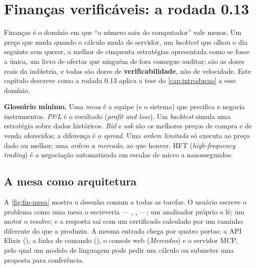 \chapter{Finanças verificáveis: a rodada 0.13}\label{cap:financas}

Finanças é o domínio em que ``o número saiu do computador'' vale menos. Um preço que muda quando o cálculo muda de servidor, um \textit{backtest} que olhou o dia seguinte sem querer, a melhor de cinquenta estratégias apresentada como se fosse a única, um livro de ofertas que ninguém de fora consegue auditar: são as dores reais da indústria, e todas são dores de \textbf{verificabilidade}, não de velocidade. Este capítulo descreve como a rodada 0.13 aplica a tese do \autoref{cap:introducao} a esse domínio.

\begin{graduacao}
\textbf{Glossário mínimo.} Uma \emph{mesa} é a equipe (e o sistema) que precifica e negocia instrumentos. \emph{P\&L} é o resultado (\textit{profit and loss}). Um \emph{backtest} simula uma estratégia sobre dados históricos. \emph{Bid} e \emph{ask} são os melhores preços de compra e de venda oferecidos; a diferença é o \emph{spread}. Uma \emph{ordem limitada} só executa ao preço dado ou melhor; uma \emph{ordem a mercado}, ao que houver. HFT (\textit{high-frequency trading}) é a negociação automatizada em escalas de micro a nanossegundos.
\end{graduacao}

\section{A mesa como arquitetura}\label{sec:fin-mesa}

A \autoref{fig:fin-mesa} mostra o desenho comum a todas as tarefas. O usuário escreve o problema como uma mesa o escreveria --- , ,  ---; um analisador próprio o lê; um motor o resolve; e a resposta sai com um certificado calculado por um caminho diferente do que a produziu. A mesma entrada chega por quatro portas: a API Elixir (), a linha de comando (), o console web (\emph{Mercados}) e o servidor MCP, pelo qual um modelo de linguagem pode pedir um cálculo ou submeter uma proposta para conferência.

